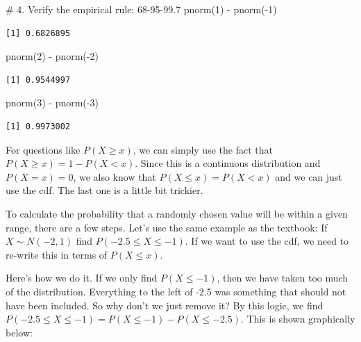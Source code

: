 \documentclass[
  letterpaper,
  DIV=11,
  numbers=noendperiod]{scrreprt}
\newenvironment{Shaded}{\begin{snugshade}}{\end{snugshade}}
\newcommand{\CommentTok}[1]{\textcolor[rgb]{0.37,0.37,0.37}{#1}}
\newcommand{\DecValTok}[1]{\textcolor[rgb]{0.68,0.00,0.00}{#1}}
\newcommand{\FunctionTok}[1]{\textcolor[rgb]{0.28,0.35,0.67}{#1}}
\newcommand{\NormalTok}[1]{\textcolor[rgb]{0.00,0.23,0.31}{#1}}
\newcommand{\SpecialCharTok}[1]{\textcolor[rgb]{0.37,0.37,0.37}{#1}}
\begin{document}
\begin{Shaded}
\begin{Highlighting}[]
\CommentTok{\# 4. Verify the empirical rule: 68{-}95{-}99.7}
\FunctionTok{pnorm}\NormalTok{(}\DecValTok{1}\NormalTok{) }\SpecialCharTok{{-}} \FunctionTok{pnorm}\NormalTok{(}\SpecialCharTok{{-}}\DecValTok{1}\NormalTok{)}
\end{Highlighting}
\end{Shaded}

\begin{verbatim}
[1] 0.6826895
\end{verbatim}

\begin{Shaded}
\begin{Highlighting}[]
\FunctionTok{pnorm}\NormalTok{(}\DecValTok{2}\NormalTok{) }\SpecialCharTok{{-}} \FunctionTok{pnorm}\NormalTok{(}\SpecialCharTok{{-}}\DecValTok{2}\NormalTok{)}
\end{Highlighting}
\end{Shaded}

\begin{verbatim}
[1] 0.9544997
\end{verbatim}

\begin{Shaded}
\begin{Highlighting}[]
\FunctionTok{pnorm}\NormalTok{(}\DecValTok{3}\NormalTok{) }\SpecialCharTok{{-}} \FunctionTok{pnorm}\NormalTok{(}\SpecialCharTok{{-}}\DecValTok{3}\NormalTok{)}
\end{Highlighting}
\end{Shaded}

\begin{verbatim}
[1] 0.9973002
\end{verbatim}

For questions like \(P(X\ge x)\), we can simply use the fact that
\(P(X \ge x) = 1 - P(X<x)\). Since this is a continuous distribution and
\(P(X = x)=0\), we also know that \(P(X\le x) = P(X<x)\) and we can just
use the cdf. The last one is a little bit trickier.

To calculate the probability that a randomly chosen value will be within
a given range, there are a few steps. Let's use the same example as the
textbook: If \(X\sim N(-2, 1)\) find \(P(-2.5\le X\le -1)\). If we want
to use the cdf, we need to re-write this in terms of \(P(X\le x)\).

Here's how we do it. If we only find \(P(X\le-1)\), then we have taken
too much of the distribution. Everything to the left of -2.5 was
something that should not have been included. So why don't we just
remove it? By this logic, we find
\(P(-2.5\le X \le -1) = P(X\le -1) - P(X \le -2.5)\). This is shown
graphically below:
\end{document}

